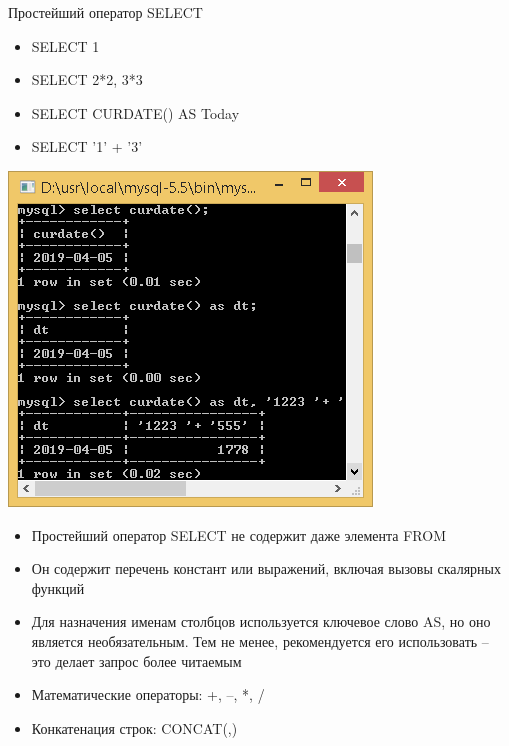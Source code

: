 \documentclass{beamer}
\begin{document}
\begin{frame}{Простейший оператор SELECT}
	\begin{minipage}{0.3\textwidth}
		\begin{flushleft}
			\begin{itemize}
				\item SELECT 1
				\item SELECT 2*2, 3*3
				\item SELECT CURDATE() AS Today
				\item SELECT '1' + '3'
		  	\end{itemize}
			\begin{center}
				\includegraphics[scale=0.2]{images/SQL-01.png}
			\end{center}
		\end{flushleft}
	\end{minipage}
	\begin{minipage}{0.6\textwidth}
		\begin{flushright}
			\begin{itemize}
				\item Простейший оператор SELECT не содержит даже элемента FROM 
				\item Он содержит перечень констант или выражений, включая вызовы скалярных функций
				\item Для назначения именам столбцов используется ключевое слово AS, но оно является необязательным. Тем не менее, рекомендуется его использовать – это делает запрос более читаемым 
				\item Математические операторы: +, –, *, / 
				\item Конкатенация строк: CONCAT(,)
			\end{itemize}
		\end{flushright}
	\end{minipage}
\end{frame}
\end{document}
